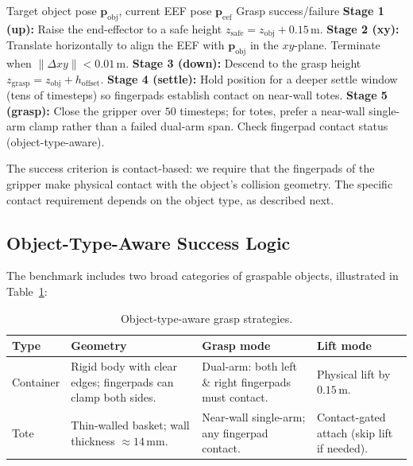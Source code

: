 \begin{algorithm}[H]
\caption{Scripted 5-stage grasp.}
\label{alg:scripted_grasp}
\begin{algorithmic}[1]
\Require Target object pose $\mathbf{p}_{\text{obj}}$, current EEF pose $\mathbf{p}_{\text{eef}}$
\Ensure Grasp success/failure
\State \textbf{Stage 1 (up):} Raise the end-effector to a safe height $z_{\text{safe}} = z_{\text{obj}} + 0.15\,\mathrm{m}$.
\State \textbf{Stage 2 (xy):} Translate horizontally to align the EEF with $\mathbf{p}_{\text{obj}}$ in the $xy$-plane. Terminate when $\|\Delta xy\| < 0.01\,\mathrm{m}$.
\State \textbf{Stage 3 (down):} Descend to the grasp height $z_{\text{grasp}} = z_{\text{obj}} + h_{\text{offset}}$.
\State \textbf{Stage 4 (settle):} Hold position for a deeper settle window (tens of timesteps) so fingerpads establish contact on near-wall totes.
\State \textbf{Stage 5 (grasp):} Close the gripper over $50$ timesteps; for totes, prefer a near-wall single-arm clamp rather than a failed dual-arm span.
\State \Return Check fingerpad contact status (object-type-aware).
\end{algorithmic}
\end{algorithm}

The success criterion is contact-based: we require that the fingerpads of the gripper make physical contact with the object's collision geometry. The specific contact requirement depends on the object type, as described next.

\subsection{Object-Type-Aware Success Logic}
\label{sec:scripted_grasp:object_types}

The benchmark includes two broad categories of graspable objects, illustrated in Table~\ref{tab:object_types}:

\begin{table}[h]
\centering
\caption{Object-type-aware grasp strategies.}
\label{tab:object_types}
\small
\begin{tabular}{p{} p{} p{} p{}}
\toprule
\textbf{Type} & \textbf{Geometry} & \textbf{Grasp mode} & \textbf{Lift mode} \\
\midrule
Container & Rigid body with clear edges; fingerpads can clamp both sides. & Dual-arm: both left \& right fingerpads must contact. & Physical lift by $0.15\,\mathrm{m}$. \\
Tote & Thin-walled basket; wall thickness $\approx 14\,\mathrm{mm}$. & Near-wall single-arm; any fingerpad contact. & Contact-gated attach (skip lift if needed). \\
\bottomrule
\end{tabular}
\end{table}

